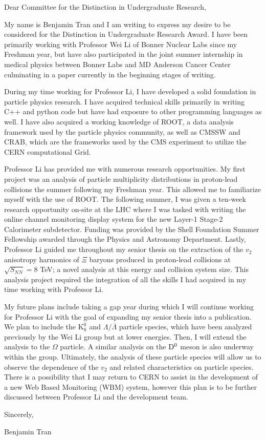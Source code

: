 \documentclass[12pt]{article}
\begin{document}
Dear Committee for the Distinction in Undergraduate Research,

My name is Benjamin Tran and I am writing to express my desire to be considered
for the Distinction in Undergraduate Research Award. I have been primarily
working with Professor Wei Li of Bonner Nuclear Labs since my Freshman year, but
have also participated in the joint summer internship in medical physics between
Bonner Labs and MD Anderson Cancer Center culminating in a paper currently in
the beginning stages of writing.\par

During my time working for Professor Li, I have developed a solid foundation in
particle physics research. I have acquired technical skills primarily in writing
C++ and python code but have had exposure to other programming languages as
well. I have also acquired a working knowledge of ROOT, a data analysis
framework used by the particle physics community, as well as CMSSW and CRAB,
which are the frameworks used by the CMS experiment to utilize the CERN
computational Grid.\par

Professor Li has provided me with numerous research opportunities. My first
project was an analysis of particle multiplicity distributions in proton-lead
collisions the summer following my Freshman year. This allowed me to familiarize
myself with the use of ROOT. The following summer, I was given a ten-week
research opportunity on-site at the LHC where I was tasked with writing the
online channel monitoring display system for the new Layer-1 Stage-2 Calorimeter
subdetector. Funding was provided by the Shell Foundation Summer Fellowship
awarded through the Physics and Astronomy Department. Lastly, Professor Li
guided me throughout my senior thesis on the extraction of the $ v_{2} $
anisotropy harmonics of $ \Xi $ baryons produced in proton-lead collisions at $
\sqrt{S_{NN}} = 8 $ TeV; a novel analysis at this energy and collision system
size. This analysis project required the integration of all the skills I had
acquired in my time working with Professor Li.\par

My future plans include taking a gap year during which I will continue working
for Professor Li with the goal of expanding my senior thesis into a publication.
We plan to include the $ \mathrm{K_{S}^{0}} $ and $ \Lambda/\overline{\Lambda} $
particle species, which have been analyzed previously by the Wei Li group but at
lower energies. Then, I will extend the analysis to the $ \Omega $ particle. A
similar analysis on the $ \mathrm{D}\textsuperscript{0} $ meson is also underway
within the group. Ultimately, the analysis of these particle species will allow
us to observe the dependence of the $ v_{2} $ and related characteristics on
particle species. There is a possibility that I may return to CERN to assist in
the development of a new Web Based Monitoring (WBM) system, however this plan is
to be further discussed between Professor Li and the development team.\par
\vspace{0.75cm}
Sincerely,\par
\vspace{0.35cm}
Benjamin Tran
\end{document}
